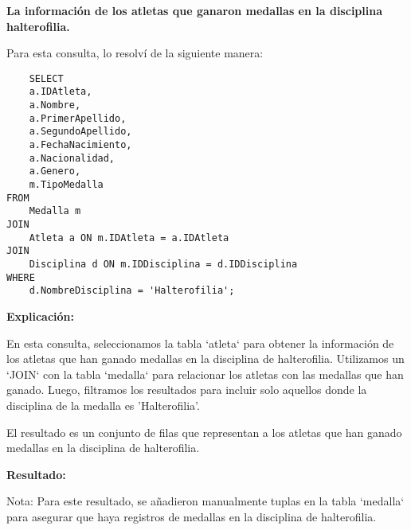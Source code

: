 \textbf{La información de los atletas que ganaron medallas en la disciplina halterofilia.}\vspace{.3cm}

Para esta consulta, lo resolví de la siguiente manera: \vspace{.3cm}

\begin{lstlisting}
    SELECT 
    a.IDAtleta,
    a.Nombre,
    a.PrimerApellido,
    a.SegundoApellido,
    a.FechaNacimiento,
    a.Nacionalidad,
    a.Genero,
    m.TipoMedalla
FROM 
    Medalla m
JOIN 
    Atleta a ON m.IDAtleta = a.IDAtleta
JOIN 
    Disciplina d ON m.IDDisciplina = d.IDDisciplina
WHERE 
    d.NombreDisciplina = 'Halterofilia';
\end{lstlisting}

\textbf{Explicación:} \vspace{.3cm}

En esta consulta, seleccionamos la tabla `atleta` para obtener la información de los atletas que han ganado medallas en la disciplina de halterofilia. Utilizamos un `JOIN` con la tabla `medalla` para relacionar los atletas con las medallas que han ganado. Luego, filtramos los resultados para incluir solo aquellos donde la disciplina de la medalla es 'Halterofilia'. \vspace{.3cm}

El resultado es un conjunto de filas que representan a los atletas que han ganado medallas en la disciplina de halterofilia. \vspace{.3cm}

\textbf{Resultado:}
\begin{center}
    
\end{center}   

Nota: Para este resultado, se añadieron manualmente tuplas en la tabla `medalla` para asegurar que haya registros de medallas en la disciplina de halterofilia. \vspace{.3cm}